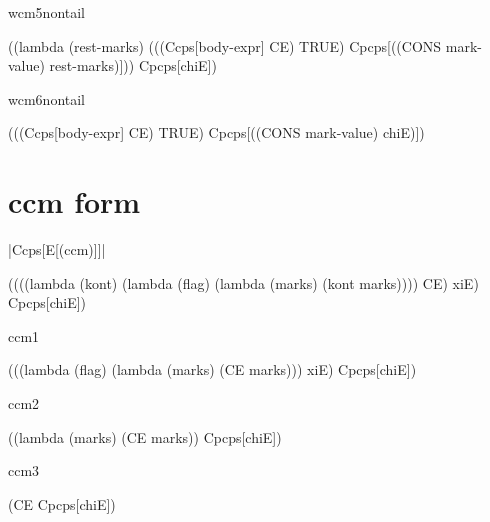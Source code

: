 \noindent
wcm5nontail

\begin{schemeblock}
\begin{schemedisplay}
((lambda (rest-marks) 
   (((Ccps[body-expr] CE) TRUE) Cpcps[((CONS mark-value) rest-marks)]))
 Cpcps[chiE])
\end{schemedisplay}
\end{schemeblock}

\noindent
wcm6nontail

\begin{schemeblock}
\begin{schemedisplay}
(((Ccps[body-expr] CE) TRUE) Cpcps[((CONS mark-value) chiE)])
\end{schemedisplay}
\end{schemeblock}

\section{ccm form}

\noindent
\scheme|Ccps[E[(ccm)]]|
\begin{schemeblock}
\begin{schemedisplay}
((((lambda (kont)
     (lambda (flag)
       (lambda (marks)
         (kont marks))))
   CE) xiE) Cpcps[chiE])
\end{schemedisplay}
\end{schemeblock}

\noindent
ccm1

\begin{schemeblock}
\begin{schemedisplay}
(((lambda (flag)
    (lambda (marks)
      (CE marks)))
  xiE) Cpcps[chiE])
\end{schemedisplay}
\end{schemeblock}

\noindent
ccm2

\begin{schemeblock}
\begin{schemedisplay}
((lambda (marks)
   (CE marks))
 Cpcps[chiE])
\end{schemedisplay}
\end{schemeblock}

\noindent
ccm3

\begin{schemeblock}
\begin{schemedisplay}
(CE Cpcps[chiE])
\end{schemedisplay}
\end{schemeblock}

